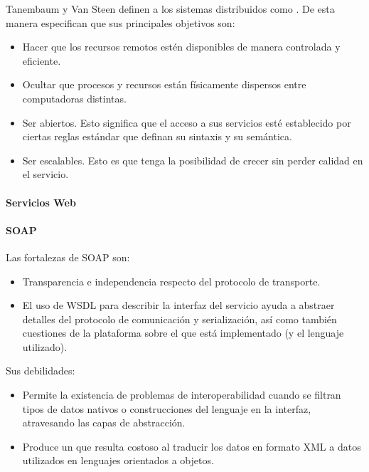 Tanembaum y Van Steen definen a los sistemas distribuidos como \cite[p.~2]{tanenbaum2007distributed}. De esta manera especifican que sus principales objetivos son:

\begin{itemize}
\item Hacer que los recursos remotos estén disponibles de manera controlada y eficiente.
\item Ocultar que procesos y recursos están físicamente dispersos entre computadoras distintas.
\item Ser abiertos. Esto significa que el acceso a sus servicios esté establecido por ciertas reglas estándar que definan su sintaxis y su semántica.
\item Ser escalables. Esto es que tenga la posibilidad de crecer sin perder calidad en el servicio.
\end{itemize}

\paragraph{Servicios Web}
\label{servicios_web}

\paragraph{SOAP}
\label{soap}

Las fortalezas de SOAP\cite{pautasso2008restful} son:
\begin{itemize}
\item Transparencia e independencia respecto del protocolo de transporte.
\item El uso de \gls{WSDL} para describir la interfaz del servicio ayuda a abstraer detalles del protocolo de comunicación y serialización, así como también cuestiones de la plataforma sobre el que está implementado (y el lenguaje utilizado).
\end{itemize}
Sus debilidades:
\begin{itemize}
\item Permite la existencia de problemas de interoperabilidad cuando se filtran tipos de datos nativos o construcciones del lenguaje en la interfaz, atravesando las capas de abstracción.
\item Produce un  que resulta costoso al traducir los datos en formato \gls{XML} a datos utilizados en lenguajes orientados a objetos.
\end{itemize}


